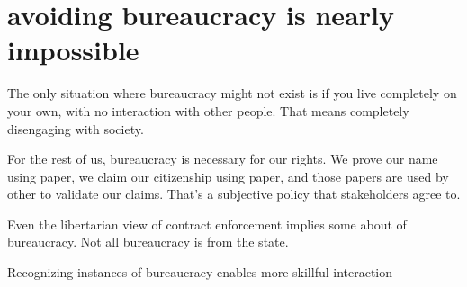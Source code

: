 \section{avoiding bureaucracy is nearly impossible}

The only situation where bureaucracy might not exist is if you live completely on your own, with no interaction with other people. That means completely disengaging with society. 

For the rest of us, bureaucracy is necessary for our rights. We prove our name using paper, we claim our citizenship using paper, and those papers are used by other to validate our claims. That's a subjective policy that stakeholders agree to. 

Even the libertarian view of contract enforcement implies some about of bureaucracy. Not all bureaucracy is from the state. 

Recognizing instances of bureaucracy enables more skillful interaction


